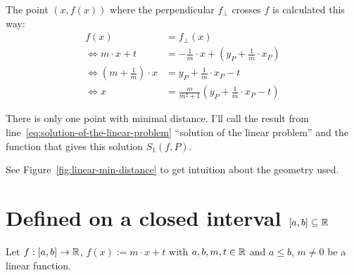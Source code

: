 The point $(x, f(x))$ where the perpendicular $f_\bot$ crosses $f$
is calculated this way:
\begin{align}
    f(x) &= f_\bot(x)\\
    \Leftrightarrow m \cdot x + t &= - \frac{1}{m} \cdot x + \left(y_P + \frac{1}{m} \cdot x_P \right)\\
    \Leftrightarrow \left (m + \frac{1}{m} \right ) \cdot x &= y_P + \frac{1}{m} \cdot x_P - t\\
    \Leftrightarrow x &= \frac{m}{m^2+1} \left ( y_P + \frac{1}{m} \cdot x_P - t \right )\label{eq:solution-of-the-linear-problem}
\end{align}

There is only one point with minimal distance. I'll call the result
from line~\ref{eq:solution-of-the-linear-problem} \enquote{solution of 
the linear problem} and the function that gives this solution 
$S_1(f,P)$.

See Figure~\ref{fig:linear-min-distance}
to get intuition about the geometry used.
\clearpage

\section{Defined on a closed interval $[a,b] \subseteq \mathbb{R}$}
Let $f:[a,b] \rightarrow \mathbb{R}$, $f(x) := m\cdot x + t$ with $a,b,m,t \in \mathbb{R}$ and 
$a \leq b$, $m \neq 0$  be a linear function.

